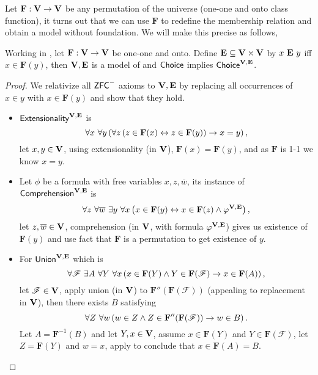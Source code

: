 \newcommand*{\F}{\mathbf{F}}
Let \(\mathbf{F}:\mathbf{V}\to\mathbf{V}\) be any permutation of the universe (one-one and onto class function),
it turns out that we can use \(\mathbf{F}\) to redefine the membership relation and obtain a model without foundation.
We will make this precise as follows,
\begin{lemma} %
    \label{KunenC4E18}
    Working in \ZFminus, let \(\mathbf{F}:\mathbf{V}\to\mathbf{V}\) be one-one and onto.
    Define \(\mathbf{E}\subseteq \mathbf{V}\times\mathbf{V}\) by \(x\ \mathbf{E}\ y\) iff \(x\in \mathbf{F}(y)\),
    then \(\mathbf{V},\mathbf{E}\) is a model of \ZFminus
    and \({\normalfont\textsf{Choice}}\) implies \({\normalfont\textsf{Choice}}^{\mathbf{V},\mathbf{E}}\).
\end{lemma}
\begin{proof}
    We relativize all \(\mbox{\normalfont \textsf{ZFC}}^-\) axioms to \(\mathbf{V},\mathbf{E}\) by replacing all occurrences of \(x\in y\) with \(x\in \F(y)\)
    and show that they hold.
    \begin{itemize}
        \item \(\textsf{Extensionality}^{\mathbf{V},\mathbf{E}}\) is
            \[ \forall x~\forall y \paren{
                    \forall z \paren{z\in \F(x) \leftrightarrow z\in \F(y)} \rightarrow x = y
            },\]
            let \(x, y\in \mathbf{V}\), using extensionality (in \(\mathbf{V}\)), \(\F(x) = \F(y)\), and as \(\F\) is 1-1 we know \(x = y\).

        \item Let \(\phi\) be a formula with free variables \(x,z,\overline{w}\), its instance of \(\textsf{Comprehension}^{\mathbf{V},\mathbf{E}}\) is
            \[ \forall z~\forall \overline{w}~\exists y~\forall x \paren{
                    x \in \F(y) \leftrightarrow x\in \F(z) \land \phi^{\V,\mathbf{E}}
            },\]
            let \(z,\overline{w}\in \mathbf{V}\), comprehension (in \(\mathbf{V}\), with formula \(\varphi^{\mathbf{V},\mathbf{E}}\)) gives us existence of \(\F(y)\) and use fact that \(\F\) is a permutation to get existence of \(y\).

        \item For \(\textsf{Union}^{\mathbf{V},\mathbf{E}}\) which is
            \[
                \forall \mathscr{F}~\exists A~\forall Y~\forall x\paren{x\in \F(Y)\land Y\in\F(\mathscr{F}) \rightarrow x\in\F(A)},
            \]
            let \(\mathscr{F}\in\mathbf{V}\),
            apply union (in \(\mathbf{V}\)) to \(\F''(\F(\mathscr{F}))\) (appealing to replacement in \(\mathbf{V}\)),
            then there exists \(B\) satisfying
            \begin{equation}\label{c2:eqn:union}
                \forall Z~\forall w\paren{w\in Z\land Z\in \F''(\F(\mathscr{F})) \rightarrow w\in B}.
            \end{equation}
            Let \(A = \F^{-1}(B)\) and let \(Y,x\in\mathbf{V}\), assume \(x\in \F(Y)\) and \(Y\in\F(\mathscr{F})\),
            let \(Z = \F(Y)\) and \(w = x\), apply  to conclude that \(x\in \F(A) = B\).


\end{itemize}
\end{proof}
